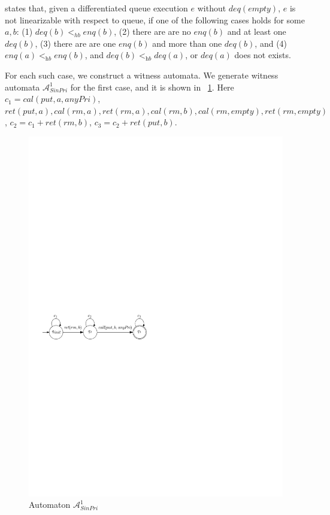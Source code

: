 \cite{Bouajjani:2015} states that, given a differentiated queue execution $e$ without $\textit{deq}(\textit{empty})$, $e$ is not linearizable with respect to queue, if one of the following cases holds for some $a,b$: (1) $\textit{deq}(b) <_{hb} \textit{enq}(b)$, (2) there are are no $\textit{enq}(b)$ and at least one $\textit{deq}(b)$, (3) there are are one $\textit{enq}(b)$ and more than one $\textit{deq}(b)$, and (4) $\textit{enq}(a) <_{\textit{hb}} \textit{enq}(b)$, and $\textit{deq}(b) <_{\textit{hb}} \textit{deq}(a)$, or $\textit{deq}(a)$ does not exists.

For each such case, we construct a witness automata. We generate witness automata $\mathcal{A}_{\textit{SinPri}}^1$ for the first case, and it is shown in \figurename~\ref{fig:automata for FIFO-1 in appendix}. Here $c_1 = \textit{cal}(\textit{put},a,\textit{anyPri})$, $\textit{ret}(\textit{put},a), \textit{cal}(\textit{rm},a),\textit{ret}(\textit{rm},a),\textit{cal}(\textit{rm},b),\textit{cal}(\textit{rm},\textit{empty}),\textit{ret}(\textit{rm},\textit{empty})$, $c_2 = c_1 + \textit{ret}(\textit{rm},b)$, $c_3 = c_2 + \textit{ret}(\textit{put},b)$.


\begin{figure}[htbp]
  \centering
  \includegraphics[width=0.6 \textwidth]{figures/PIC_AUTO_FIFO_1.pdf}
  \caption{Automaton $\mathcal{A}_{\textit{SinPri}}^1$}
  \label{fig:automata for FIFO-1 in appendix}
\end{figure}


